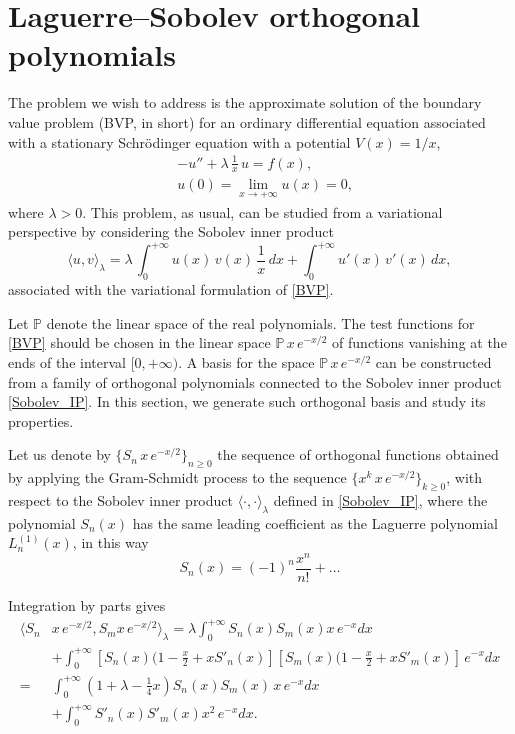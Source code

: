 \documentclass[reqno,10pt]{amsart}
\theoremstyle{plain}
\numberwithin{equation}{section}
\numberwithin{figure}{section}
\begin{document}
\section{
Laguerre--Sobolev orthogonal polynomials
}

The problem we wish to address is the approximate solution of the boundary value problem (BVP, in short) for an ordinary differential equation associated with a stationary Schr\"odinger equation with a potential $V (x) = 1/x$,
\begin{equation}\label{BVP}
\begin{aligned}
& - u '' + \lambda\,\frac{1}{x}\,u = f(x), \\
& u(0)= \lim_{x \to +\infty}u(x) = 0,
\end{aligned}
\end{equation}
where $\lambda >0$. This problem, as usual, can be studied from a variational perspective by considering the Sobolev inner product
\begin{equation}\label{Sobolev_IP}
\langle u, v\rangle_\lambda = \lambda \,\int_{0}^{+\infty} u(x)\,v(x)\,\frac{1}{x}\,dx + \int_{0}^{+\infty} u'(x)\,v'(x)\,dx,
\end{equation}
associated with the variational formulation of \eqref{BVP}.

Let $\mathbb{P}$ denote the linear space of the real polynomials. The test functions for \eqref{BVP} should be chosen in the linear space $\mathbb{P}\, x\,e^{-x/2}$ of functions vanishing at the ends of the interval $[0,+\infty)$.  A basis for the space $\mathbb{P}\, x\,e^{-x/2}$ can be constructed from a family of orthogonal polynomials connected to the Sobolev inner product \eqref{Sobolev_IP}. In this section, we generate such orthogonal basis and study its properties.


Let us denote by $\{ S_{n}\, x\,e^{-x/2}\}_{n\geqslant0}$ the sequence of orthogonal functions obtained by applying the Gram-Schmidt process to the sequence
$\{x^k\, x \, e^{-x/2}\}_{k\geqslant0}$,
with respect to the Sobolev inner product $\langle \cdot, \cdot \rangle_\lambda$ defined in \eqref{Sobolev_IP}, where the polynomial $S_n(x)$ has the same leading coefficient as the Laguerre polynomial
$L_{n}^{(1)} (x)$, in this way
$$
S_{n}(x) = (-1)^n \frac{x^n}{n!} + \ldots
$$

Integration by parts gives
\begin{align*}
\langle S_n & x\,e^{-x/2},   S_m x\,e^{-x/2}\rangle_\lambda = \lambda \int_{0}^{+\infty} S_n(x) S_m(x) x\,e^{-x} dx\\
&+ \int_{0}^{+\infty} [S_n(x)(1-\frac{x}{2} + x S'_n(x)][S_m(x)(1-\frac{x}{2} + x S'_m (x)]\,e^{-x}dx\\
= & \int_{0}^{+\infty} ( 1 + \lambda - \frac{1}{4} x) S_n(x) S_m(x)\, x\,e^{-x}dx \\
& +\int_{0}^{+\infty} S'_n(x) S'_m(x) x^2\,e^{-x} dx.
\end{align*}
\end{document}
